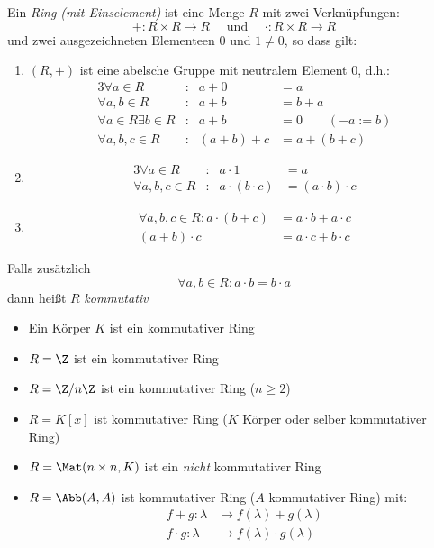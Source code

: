 \documentclass{mycourse}
\begin{document}
\begin{df}
\label{df:10.8}
Ein \emph{Ring (mit Einselement)} ist eine Menge $R$ mit zwei Verknüpfungen:
\[
+:R\times R\to R \quad \text{ und }\quad  \cdot:R\times R\to R
\]
und zwei ausgezeichneten Elementeen $0$ und $1\neq 0$, so dass gilt:
\begin{enumerate}[({R}1)]
\item
$(R,+)$ ist eine abelsche Gruppe mit neutralem Element $0$, d.h.:
\begin{alignat*}{3}
	\forall a\in R&: &a+0&=a\\
\forall a,b\in R&: &a+b&=b+a\\
\forall a\in R\exists b\in R&: &a+b&=0 \qquad (-a:=b) \\
					  \forall a,b,c\in R&:&(a+b)+c&=a+(b+c)
\end{alignat*}
\item
	\begin{alignat*}{3}
		\forall a\in R&:&a\cdot 1&=a\\
\forall a,b,c\in R&:&a\cdot(b\cdot c)&=(a\cdot b)\cdot c
\end{alignat*}
\item
\begin{align*}
\forall a,b,c\in R: a\cdot(b+c)&=a\cdot b + a\cdot c\\
(a+b)\cdot c&=a\cdot c+b\cdot c
\end{align*}
\end{enumerate}
Falls zusätzlich
\[
\forall a,b\in R: a\cdot b=b\cdot a
\]
dann heißt $R$ \emph{kommutativ}
\end{df}

\begin{ex}
\begin{itemize}
\item
Ein Körper $K$ ist ein kommutativer Ring
\item
$R=\Z$ ist ein kommutativer Ring
\item
$R=\Z/n\Z$ ist ein kommutativer Ring ($n\ge 2$)
\item
$R=K[x]$ ist kommutativer Ring ($K$ Körper oder selber kommutativer Ring)
\item
$R=\Mat(n\times n, K)$ ist ein \emph{nicht} kommutativer Ring
\item
$R=\Abb(A,A)$ ist kommutativer Ring ($A$ kommutativer Ring) mit:
\begin{align*}
f+g:\lambda &\mapsto f(\lambda) +g(\lambda)\\
f\cdot g :\lambda &\mapsto f(\lambda) \cdot g(\lambda)
\end{align*}
\end{itemize}
\end{ex}
\end{document}
